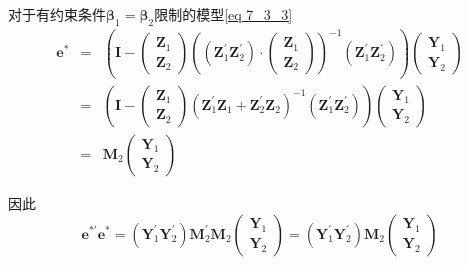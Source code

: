 		对于有约束条件$ \boldsymbol{\beta}_{1}=\boldsymbol{\beta}_{2} $限制的模型\ref{eq 7_3_3} 
		\begin{eqnarray*}
			\boldsymbol{e}^{*} & = & \left(\boldsymbol{I}-\left(\begin{array}{c}
				\boldsymbol{Z}_{1} \\
				\boldsymbol{Z}_{2}
			\end{array}\right)\left(\left(\boldsymbol{Z}_{1}^{\prime} \boldsymbol{Z}_{2}^{\prime}\right) \cdot\left(\begin{array}{c}
				\boldsymbol{Z}_{1} \\
				\boldsymbol{Z}_{2}
			\end{array}\right)\right)^{-1}\left(\boldsymbol{Z}_{1}^{\prime} \boldsymbol{Z}_{2}^{\prime}\right)\right)\left(\begin{array}{c}
				\boldsymbol{Y}_{1} \\
				\boldsymbol{Y}_{2}
			\end{array}\right) \\
			& = & \left(\boldsymbol{I}-\left(\begin{array}{c}
				\boldsymbol{Z}_{1} \\
				\boldsymbol{Z}_{2}
			\end{array}\right)\left(\boldsymbol{Z}_{1}^{\prime} \boldsymbol{Z}_{1}+\boldsymbol{Z}_{2}^{\prime} \boldsymbol{Z}_{2}\right)^{-1}\left(\boldsymbol{Z}_{1}^{\prime} \boldsymbol{Z}_{2}^{\prime}\right)\right)\left(\begin{array}{c}
				\boldsymbol{Y}_{1} \\
				\boldsymbol{Y}_{2}
			\end{array}\right) \\
			& = & \boldsymbol{M}_{2}\left(\begin{array}{l}
			\boldsymbol{Y}_{1} \\
			\boldsymbol{Y}_{2}
		\end{array}\right)
		\end{eqnarray*}

		因此
		$$ \boldsymbol{e}^{* \prime} \boldsymbol{e}^{*}=\left(\boldsymbol{Y}_{1}^{\prime} \boldsymbol{Y}_{2}^{\prime}\right) \boldsymbol{M}_{2}^{\prime} \boldsymbol{M}_{2}\left(\begin{array}{c}
			\boldsymbol{Y}_{1} \\
			\boldsymbol{Y}_{2}
		\end{array}\right)=\left(\boldsymbol{Y}_{1}^{\prime} \boldsymbol{Y}_{2}^{\prime}\right) \boldsymbol{M}_{2}\left(\begin{array}{c}
			\boldsymbol{Y}_{1} \\
			\boldsymbol{Y}_{2}
		\end{array}\right) $$


